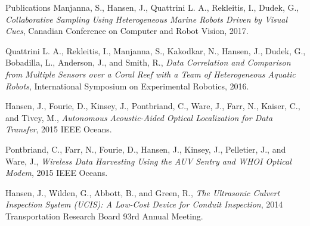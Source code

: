 \documentclass{resume} %
\begin{document}
\begin{rSection}{Publications}
Manjanna, S., Hansen, J., Quattrini L. A., Rekleitis, I., Dudek, G., 
\textit{Collaborative Sampling Using Heterogeneous Marine Robots Driven by Visual Cues}, Canadian Conference on Computer and Robot Vision, 2017. 
                
Quattrini L. A., Rekleitis, I., Manjanna, S., Kakodkar, N., Hansen, J.,   Dudek, G.,  Bobadilla, L.,  Anderson, J., and Smith, R.,
            \textit{Data Correlation and Comparison from Multiple Sensors over a Coral Reef with a Team of Heterogeneous Aquatic Robots},
             International Symposium on Experimental Robotics,
              2016.

Hansen, J., Fourie, D., Kinsey, J., Pontbriand, C., Ware, J., Farr, N., Kaiser, C., and Tivey, M., \textit{Autonomous Acoustic-Aided Optical Localization for Data Transfer}, 2015 IEEE Oceans.

Pontbriand, C., Farr, N., Fourie, D., Hansen, J.,  Kinsey, J., Pelletier, J., and Ware, J., 
 \textit{Wireless Data Harvesting Using the AUV Sentry and WHOI Optical Modem}, 2015 IEEE Oceans.

Hansen, J., Wilden, G., Abbott, B., and Green, R., \textit{The Ultrasonic Culvert
Inspection System (UCIS): A Low-Cost Device for Conduit Inspection}, 2014 Transportation
Research Board 93rd Annual Meeting. 
\end{rSection}
\end{document}
